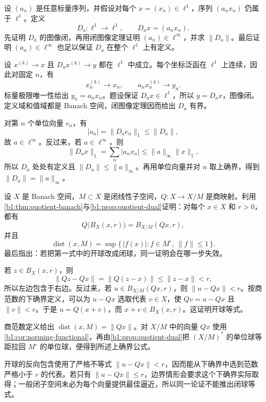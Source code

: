 \begin{exercise}\label{b1:ex:08-closed-graph-diagonal}
设 \((a_n)\) 是任意标量序列，并假设对每个 \(x=(x_n)\in\ell^1\)，序列 \((a_nx_n)\) 仍属于 \(\ell^1\)。定义
\[
D_a:\ell^1\longrightarrow\ell^1,\qquad D_ax=(a_nx_n).
\]
先证明 \(D_a\) 的图像闭，再用闭图像定理证明 \((a_n)\in\ell^\infty\)，并求 \(\|D_a\|\)。最后证明 \((a_n)\in\ell^\infty\) 也足以保证 \(D_a\) 在整个 \(\ell^1\) 上有定义。
\end{exercise}
\begin{solution}
设 \(x^{(k)}\to x\) 且 \(D_ax^{(k)}\to y\) 都在 \(\ell^1\) 中成立。每个坐标泛函在 \(\ell^1\) 上连续，因此对固定 \(n\)，有
\[
x_n^{(k)}\to x_n,\qquad a_nx_n^{(k)}\to y_n.
\]
标量极限唯一性给出 \(y_n=a_nx_n\)。题设保证 \(D_ax\in\ell^1\)，所以 \(y=D_ax\)，图像闭。定义域和值域都是 Banach 空间，闭图像定理因而给出 \(D_a\) 有界。

对第 \(n\) 个单位向量 \(e_n\)，有
\[
|a_n|=\|D_ae_n\|_1\leq\|D_a\|,
\]
故 \(a\in\ell^\infty\)。反过来，若 \(a\in\ell^\infty\)，则
\[
\|D_ax\|_1=\sum_n|a_nx_n|
\leq\|a\|_\infty\|x\|_1,
\]
所以 \(D_a\) 处处有定义且 \(\|D_a\|\leq\|a\|_\infty\)。再用单位向量并对 \(n\) 取上确界，得到 \(\|D_a\|=\|a\|_\infty\)。
\end{solution}

\begin{exercise}\label{b1:ex:08-quotient-dual}
设 \(X\) 是 Banach 空间，\(M\subset X\) 是闭线性子空间，\(Q:X\to X/M\) 是商映射。利用\cref{b1:thm:quotient-banach}与\cref{b1:prop:quotient-dual}证明：对每个 \(x\in X\) 和 \(r>0\)，都有
\[
Q\bigl(B_X(x,r)\bigr)=B_{X/M}(Qx,r),
\]
并且
\[
\operatorname{dist}(x,M)
=\sup\{\,|f(x)|:f\in M^\circ,\ \|f\|\leq1\,\}.
\]
最后指出：若把第一式中的开球改成闭球，同一证明会在哪一步失效。
\end{exercise}
\begin{solution}
若 \(z\in B_X(x,r)\)，则
\[
\|Qz-Qx\|=\|Q(z-x)\|\leq\|z-x\|<r,
\]
所以左边包含于右边。反过来，若 \(u\in B_{X/M}(Qx,r)\)，则 \(\|u-Qx\|<r\)。按商范数的下确界定义，可以为 \(u-Qx\) 选取代表 \(v\in X\)，使 \(Qv=u-Qx\) 且 \(\|v\|<r\)。于是 \(u=Q(x+v)\)，而 \(x+v\in B_X(x,r)\)。这证明开球等式。

商范数定义给出 \(\operatorname{dist}(x,M)=\|Qx\|\)。对 \(X/M\) 中的向量 \(Qx\) 使用\cref{b1:cor:norming-functional}，再由\cref{b1:prop:quotient-dual}把 \((X/M)^*\) 的单位球等距拉回 \(M^\circ\) 的单位球，便得到所述上确界公式。

开球的反向包含使用了严格不等式 \(\|u-Qx\|<r\)，因而能从下确界中选到范数严格小于 \(r\) 的代表。若只有 \(\|u-Qx\|\leq r\)，边界情形会要求这个下确界实际取得；一般闭子空间未必为每个向量提供最佳逼近，所以同一论证不能推出闭球等式。
\end{solution}

